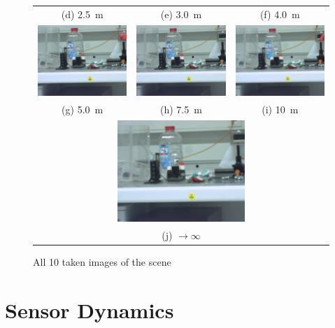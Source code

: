 \documentclass[
a4paper,     %
12pt         %
]{scrartcl}  %
\begin{document}
\begin{figure}
\begin{tabular}{ccc}
(d) \SI{2.5}{m}& (e) \SI{3.0}{m} & (f) \SI{4.0}{m}\\[6pt]
 \includegraphics[width=48mm]{./Bildg_Messtechnik_Lab/Autofokus/images/image_05.png} & \includegraphics[width=48mm]{./Bildg_Messtechnik_Lab/Autofokus/images/image_07_5.png} & \includegraphics[width=48mm]{./Bildg_Messtechnik_Lab/Autofokus/images/image_10.png}\\
(g) \SI{5.0}{m} & (h) \SI{7.5}{m} & (i) \SI{10}{m}\\[6pt]
 \multicolumn{3}{c}{\includegraphics[width=48mm]{./Bildg_Messtechnik_Lab/Autofokus/images/image_inf.png}} \\[6pt]
 \multicolumn{3}{c}{(j) $\rightarrow\infty$}
\end{tabular}
\caption{All 10 taken images of the scene}
\label{fig:alltakenimages}
\end{figure}

\pagebreak

\section{Sensor Dynamics}
\end{document}
